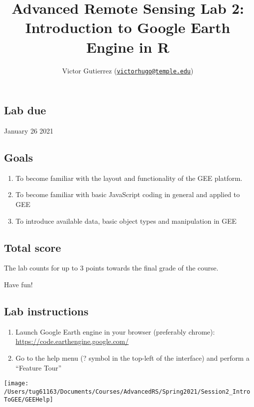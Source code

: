 \documentclass[]{article}
\title{Advanced Remote Sensing Lab 2: Introduction to Google Earth Engine in R}
\author{Victor Gutierrez
(\href{mailto:victorhugo@temple.edu}{\nolinkurl{victorhugo@temple.edu}})}
\date{}
\providecommand{\tightlist}{%
  \setlength{\itemsep}{0pt}\setlength{\parskip}{0pt}}
\begin{document}
\maketitle

\hypertarget{lab-due}{%
\subsection{Lab due}\label{lab-due}}

January 26 2021

\hypertarget{goals}{%
\subsection{Goals}\label{goals}}

\begin{enumerate}
\def\labelenumi{\arabic{enumi}.}
\tightlist
\item
  To become familiar with the layout and functionality of the GEE
  platform.
\item
  To become familiar with basic JavaScript coding in general and applied
  to GEE
\item
  To introduce available data, basic object types and manipulation in
  GEE
\end{enumerate}

\hypertarget{total-score}{%
\subsection{Total score}\label{total-score}}

The lab counts for up to 3 points towards the final grade of the course.

Have fun!

\hypertarget{lab-instructions}{%
\subsection{Lab instructions}\label{lab-instructions}}

\begin{enumerate}
\def\labelenumi{\arabic{enumi}.}
\item
  Launch Google Earth engine in your browser (preferably chrome):
  \url{https://code.earthengine.google.com/}
\item
  Go to the help menu (? symbol in the top-left of the interface) and
  perform a ``Feature Tour''
\end{enumerate}

\texttt{[image: /Users/tug61163/Documents/Courses/AdvancedRS/Spring2021/Session2\_IntroToGEE/GEEHelp]}
\end{document}
